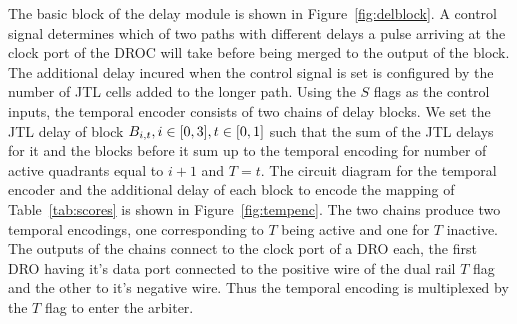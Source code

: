 \documentclass[conference]{IEEEtran}
\begin{document}
The basic block of the delay module is shown in Figure~\ref{fig:delblock}.
A control signal determines which of two paths with different delays a pulse arriving at the clock port of the DROC will take before being merged to the output of the block.
The additional delay incured when the control signal is set is configured by the number of JTL cells added to the longer path.
Using the $S$ flags as the control inputs, the temporal encoder consists of two chains of delay blocks.
We set the JTL delay of block $B_{i,t}, i \in \interval{0}{3}, t \in \interval{0}{1}$ such that the sum of the JTL delays for it and the blocks before it sum up to the temporal encoding for number of active quadrants equal to $i+1$ and $T = t$.
The circuit diagram for the temporal encoder and the additional delay of each block to encode the mapping of Table~\ref{tab:scores} is shown in Figure~\ref{fig:tempenc}.
The two chains produce two temporal encodings, one corresponding to $T$ being active and one for $T$ inactive.
The outputs of the chains connect to the clock port of a DRO each, the first DRO having it's data port connected to the positive wire of the dual rail $T$ flag and the other to it's negative wire.
Thus the temporal encoding is multiplexed by the $T$ flag to enter the arbiter.
\end{document}
